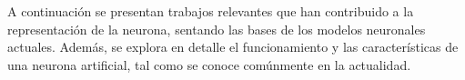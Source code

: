 A continuación se presentan trabajos relevantes que han contribuido a la representación de la neurona, sentando las bases de los modelos neuronales actuales. Además, se explora en detalle el funcionamiento y las características de una neurona artificial, tal como se conoce comúnmente en la actualidad.